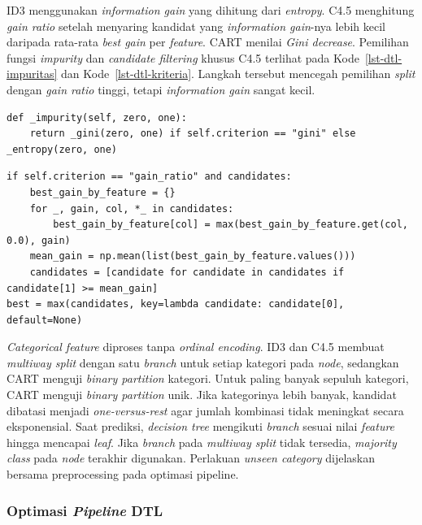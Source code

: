 ID3 menggunakan \textit{information gain} yang dihitung dari \textit{entropy}. C4.5 menghitung \textit{gain ratio} setelah menyaring kandidat yang \textit{information gain}-nya lebih kecil daripada rata-rata \textit{best gain} per \textit{feature}. CART menilai \textit{Gini decrease}. Pemilihan fungsi \textit{impurity} dan \textit{candidate filtering} khusus C4.5 terlihat pada Kode~\ref{lst-dtl-impuritas} dan Kode~\ref{lst-dtl-kriteria}. Langkah tersebut mencegah pemilihan \textit{split} dengan \textit{gain ratio} tinggi, tetapi \textit{information gain} sangat kecil.

\begin{lstlisting}[caption={Pemilihan fungsi impurity pada decision tree},label={lst-dtl-impuritas}]
def _impurity(self, zero, one):
    return _gini(zero, one) if self.criterion == "gini" else _entropy(zero, one)
\end{lstlisting}

\begin{lstlisting}[caption={Penyaringan kandidat dan pemilihan split pada C4.5},label={lst-dtl-kriteria}]
if self.criterion == "gain_ratio" and candidates:
    best_gain_by_feature = {}
    for _, gain, col, *_ in candidates:
        best_gain_by_feature[col] = max(best_gain_by_feature.get(col, 0.0), gain)
    mean_gain = np.mean(list(best_gain_by_feature.values()))
    candidates = [candidate for candidate in candidates if candidate[1] >= mean_gain]
best = max(candidates, key=lambda candidate: candidate[0], default=None)
\end{lstlisting}

\textit{Categorical feature} diproses tanpa \textit{ordinal encoding}. ID3 dan C4.5 membuat \textit{multiway split} dengan satu \textit{branch} untuk setiap kategori pada \textit{node}, sedangkan CART menguji \textit{binary partition} kategori. Untuk paling banyak sepuluh kategori, CART menguji \textit{binary partition} unik. Jika kategorinya lebih banyak, kandidat dibatasi menjadi \textit{one-versus-rest} agar jumlah kombinasi tidak meningkat secara eksponensial. Saat prediksi, \textit{decision tree} mengikuti \textit{branch} sesuai nilai \textit{feature} hingga mencapai \textit{leaf}. Jika \textit{branch} pada \textit{multiway split} tidak tersedia, \textit{majority class} pada \textit{node} terakhir digunakan. Perlakuan \textit{unseen category} dijelaskan bersama preprocessing pada optimasi pipeline.

\subsubsection{Optimasi \textit{Pipeline} DTL}

